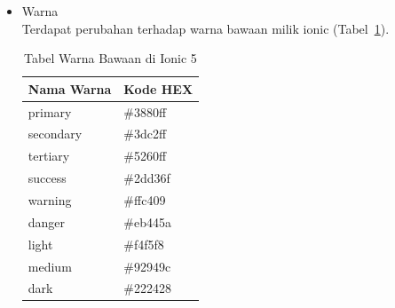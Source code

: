 \begin{enumerate}
\begin{itemize}
\begin{itemize}
			Properti selected telah dihapus. Sebagai gantinya harus mengatur properti nilai pada ion-select induk agar sesuai dengan opsi terpilih yang diinginkan (Kode~\ref{lst:selectOption}).
			\begin{lstlisting}[language=php, label={lst:selectOption}, caption=Kode Program untuk Select Option]
				<ion-select value="two">
					<ion-select-option value="one">One</ion-select-option>
					<ion-select-option value="two">Two</ion-select-option>
				</ion-select>
			\end{lstlisting}
			\item Toast \\
			Properti close button seperti showCloseButton dan closeButtonText telah dihapus. Sebagai gantinya, gunakan buttons array untuk fungsi batal (Kode~\ref{lst:toast}.
			\begin{lstlisting}[language=php, label={lst:toast}, caption=Kode Program untuk Toast]
				async presentToast() {
					const toast = await this.toastController.create({
						message: 'Your settings have been saved.',
						buttons: [
						{
							text: 'Close',
							role: 'cancel',
							handler: () => {
							console.log('Close clicked');
						}
						}
						]
					});
					toast.present();
				}
			\end{lstlisting}
		\end{itemize}
		Selain yang sudah disebutkan, terdapat beberapa komponen lain yang mendapat perubahan di Ionic 5, namun tidak ditulis di dalam dokumen skripsi ini. Komponen-komponen tersebut antara lain Action Sheet, Anchor, Card, FAB, Item, Menu Button, Nav Link, Radio, Segment, Segment Button, Skeleton Text, Split Pane, dan Tabs~\footnote{\textit{`Breaking Changes'} https://github.com/ionic-team/ionic-framework/blob/main/BREAKING.md, Diakses pada 20 November 2021. \label{ref:breakingChangesIonic5}}.
\newpage
		\item Warna \\
		Terdapat perubahan terhadap warna bawaan milik ionic (Tabel~\ref{table:colors}).
		\begin{table}[H]
		\centering
			\begin{tabular}{|l|l|}
				\hline
				Nama Warna & Kode HEX \\ \hline
				primary    & \#3880ff \\ \hline
				secondary  & \#3dc2ff \\ \hline
				tertiary   & \#5260ff \\ \hline
				success    & \#2dd36f \\ \hline
				warning    & \#ffc409 \\ \hline
				danger     & \#eb445a \\ \hline
				light      & \#f4f5f8 \\ \hline
				medium     & \#92949c \\ \hline
				dark       & \#222428 \\ \hline
			\end{tabular}
			\caption{Tabel Warna Bawaan di Ionic 5}
			\label{table:colors}
		\end{table}
		

\end{itemize}
\end{enumerate}
